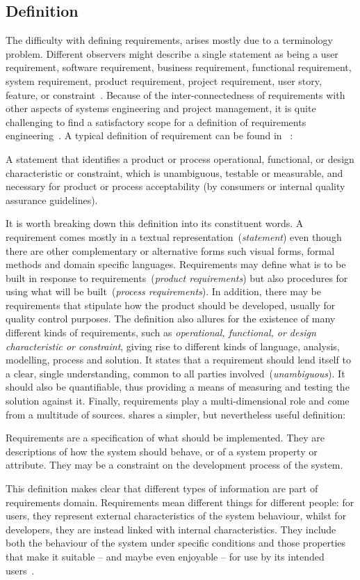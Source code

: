 \documentclass[dissertation,final]{softeng}
\begin{document}
\subsection{Definition}
The difficulty with defining requirements, arises mostly due to a terminology problem. Different observers might describe a single statement as being a user requirement, software requirement, business requirement, functional requirement, system requirement, product requirement, project requirement, user story, feature, or constraint~\citep{Wiegers2013}. Because of the inter-connectedness of requirements with other aspects of systems engineering and project management, it is quite challenging to find a satisfactory scope for a definition of requirements engineering~\citep{Hull2011}. A typical definition of requirement can be found in ~:
\begin{displayquote}
A statement that identifies a product or process operational, functional, or design characteristic or constraint, which is unambiguous, testable or measurable, and necessary for product or process acceptability (by consumers or internal quality assurance guidelines).
\end{displayquote}
It is worth breaking down this definition into its constituent words. A requirement comes mostly in a textual representation~(\emph{statement}) even though there are other complementary or alternative forms such visual forms, formal methods and domain specific languages. Requirements may define what is to be built in response to requirements~(\emph{product requirements}) but also procedures for using what will be built~(\emph{process requirements}). In addition, there may be requirements that stipulate how the product should be developed, usually for quality control purposes. The definition also allures for the existence of many different kinds of requirements, such as \emph{operational, functional, or design characteristic or constraint}, giving rise to different kinds of language, analysis, modelling, process and solution. It states that a requirement should lend itself to a clear, single understanding, common to all parties involved~(\emph{unambiguous}). It should also be quantifiable, thus providing a means of measuring and testing the solution against it. Finally, requirements play a multi-dimensional role and come from a multitude of sources. \citet{Sommerville:1997} shares a simpler, but nevertheless useful definition:
\begin{displayquote}
Requirements are a specification of what should be implemented. They are descriptions of how the system should behave, or of a system property or attribute. They may be a constraint on the development process of the system.
\end{displayquote}
This definition makes clear that different types of information are part of requirements domain. Requirements mean different things for different people: for users, they represent external characteristics of the system behaviour, whilst for developers, they are instead linked with internal characteristics. They include both the behaviour of the system under specific conditions and those properties that make it suitable -- and maybe even enjoyable -- for use by its intended users~\citep{Wiegers2013}.
\end{document}
